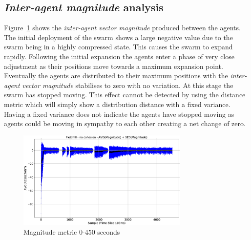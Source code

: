 \documentclass[10pt,journal,letterpaper,twoside]{IEEEtran}
\begin{document}

\subsection{\textit{Inter-agent magnitude} analysis}
Figure~\ref{emerge:REPELFILL5055-MAG} shows the \textit{inter-agent vector magnitude} produced between the agents. The initial deployment of the swarm shows a large negative value due to the swarm being in a highly compressed state. This causes the swarm to expand rapidly. Following the initial expansion the agents enter a phase of very close adjustment as their positions move towards a maximum expansion point. Eventually the agents are distributed to their maximum positions with the \textit{inter-agent vector magnitude} stabilises to zero with no variation. At this stage the swarm has stopped moving. This effect cannot be detected by using the distance metric which will simply show a distribution distance with a fixed variance. Having a fixed variance does not indicate the agents have stopped moving as agents could be moving in sympathy to each other creating a net change of zero.

\begin{figure}
\begin{center}
\includegraphics[width=8.5cm]{figures/REPELFILL5055-MAG}
\end{center}
\caption{Magnitude metric 0-450 seconds\label{emerge:REPELFILL5055-MAG}}
\end{figure}
\end{document}
